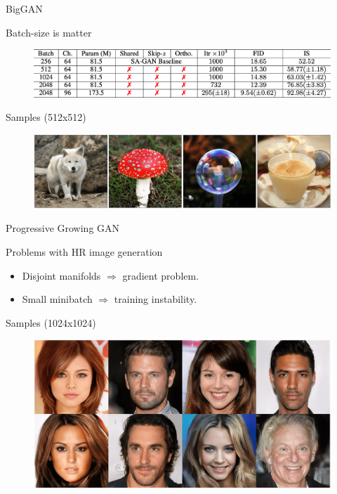 \begin{frame}{BigGAN}
	\begin{block}{Batch-size is matter}
		\begin{figure}
			\centering
			\includegraphics[width=\linewidth]{figs/biggan_results}
		\end{figure}
	\end{block}
	\begin{block}{Samples (512x512)}
		\begin{figure}
			\centering
			\includegraphics[width=\linewidth]{figs/biggan_samples}
		\end{figure}
	\end{block}
	\vspace{-0.4cm}
\end{frame}
\begin{frame}{Progressive Growing GAN}
	\begin{block}{Problems with HR image generation}
		\begin{itemize}
			\item Disjoint manifolds $\Rightarrow$ gradient problem.
			\item Small minibatch $\Rightarrow$ training instability.
		\end{itemize}
	\end{block}
	\vspace{-0.2cm}
	\begin{block}{Samples (1024x1024)}
		\vspace{-0.2cm}
		\begin{figure}
			\includegraphics[width=0.9\linewidth]{figs/pggan_samples}
		\end{figure}
	\end{block}
\end{frame}
